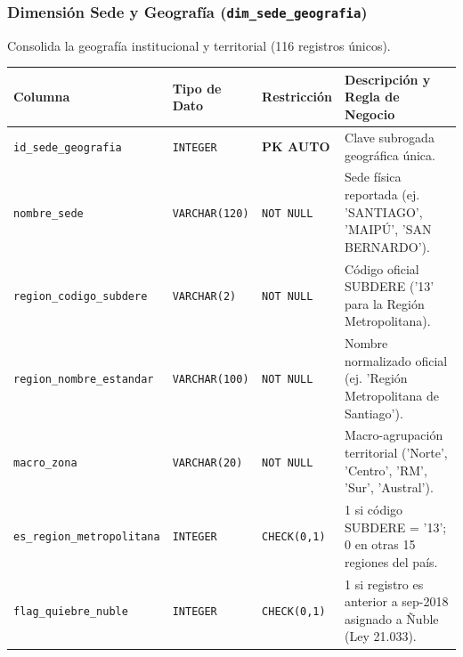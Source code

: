 \documentclass[11pt,a4paper]{article}
\begin{document}
\subsubsection{Dimensión Sede y Geografía (\texttt{dim\_sede\_geografia})}
Consolida la geografía institucional y territorial (116 registros únicos).
\begin{table}[h!]
\centering
\small
\begin{tabularx}{\textwidth}{lXlX}
\toprule
\textbf{Columna} & \textbf{Tipo de Dato} & \textbf{Restricción} & \textbf{Descripción y Regla de Negocio} \\
\midrule
\texttt{id\_sede\_geografia} & \texttt{INTEGER} & \textbf{PK AUTO} & Clave subrogada geográfica única. \\
\texttt{nombre\_sede} & \texttt{VARCHAR(120)} & \texttt{NOT NULL} & Sede física reportada (ej. 'SANTIAGO', 'MAIPÚ', 'SAN BERNARDO'). \\
\texttt{region\_codigo\_subdere} & \texttt{VARCHAR(2)} & \texttt{NOT NULL} & Código oficial SUBDERE ('13' para la Región Metropolitana). \\
\texttt{region\_nombre\_estandar} & \texttt{VARCHAR(100)} & \texttt{NOT NULL} & Nombre normalizado oficial (ej. 'Región Metropolitana de Santiago'). \\
\texttt{macro\_zona} & \texttt{VARCHAR(20)} & \texttt{NOT NULL} & Macro-agrupación territorial ('Norte', 'Centro', 'RM', 'Sur', 'Austral'). \\
\texttt{es\_region\_metropolitana} & \texttt{INTEGER} & \texttt{CHECK(0,1)} & 1 si código SUBDERE = '13'; 0 en otras 15 regiones del país. \\
\texttt{flag\_quiebre\_nuble} & \texttt{INTEGER} & \texttt{CHECK(0,1)} & 1 si registro es anterior a sep-2018 asignado a Ñuble (Ley 21.033). \\
\bottomrule
\end{tabularx}
\end{table}
\end{document}
